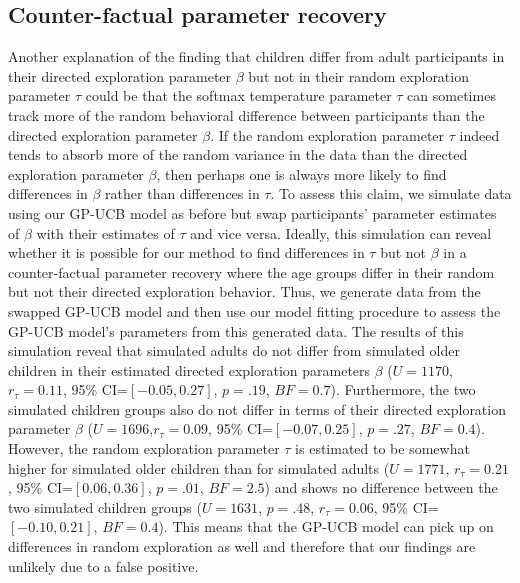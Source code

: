 \subsection{Counter-factual parameter recovery}
Another explanation of the finding that children differ from adult participants in their directed exploration parameter $\beta$ but not in their random exploration parameter $\tau$ could be that the softmax temperature parameter $\tau$ can sometimes track more of the random behavioral difference between participants than the directed exploration parameter $\beta$. If the random exploration parameter $\tau$ indeed tends to absorb more of the random variance in the data than the directed exploration parameter $\beta$, then perhaps one is always more likely to find differences in $\beta$ rather than differences in $\tau$. To assess this claim, we simulate data using our GP-UCB model as before but swap participants' parameter estimates of $\beta$ with their estimates of $\tau$ and vice versa. Ideally, this simulation can reveal whether it is possible for our method to find differences in $\tau$ but not $\beta$ in a counter-factual parameter recovery where the age groups differ in their random but not their directed exploration behavior. Thus, we generate data from the swapped GP-UCB model and then use our model fitting procedure to assess the GP-UCB model's parameters from this generated data. The results of this simulation reveal that simulated adults do not differ from simulated older children in their estimated directed exploration parameters $\beta$ ($U=1170$, $r_\tau=0.11$, 95\% CI=$[-0.05,0.27]$, $p=.19$, $BF=0.7$). Furthermore, the two simulated children groups also do not differ in terms of their directed exploration parameter $\beta$ ($U=1696$,$r_\tau=0.09$, 95\% CI=$[-0.07,0.25]$, $p=.27$, $BF=0.4$). However, the random exploration parameter $\tau$ is estimated to be somewhat higher for simulated older children than for simulated adults ($U=1771$, $r_\tau=0.21$, 95\% CI=$[0.06,0.36]$, $p=.01$, $BF=2.5$) and shows no difference between the two simulated children groups ($U=1631$, $p=.48$, $r_\tau=0.06$, 95\% CI=$[-0.10,0.21]$, $BF=0.4$). This means that the GP-UCB model can pick up on differences in random exploration as well and therefore that our findings are unlikely due to a false positive.

